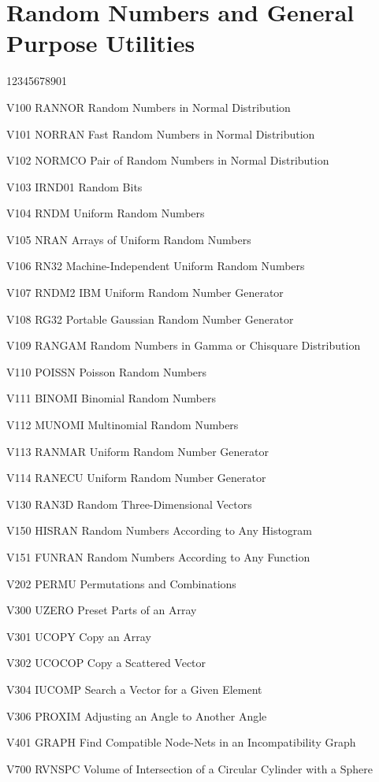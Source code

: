 \section*{Random Numbers and General Purpose Utilities}
\begin{DLtt}{12345678901}
\item[V100 RANNOR] Random Numbers in Normal Distribution
\item[V101 NORRAN] Fast Random Numbers in Normal Distribution
\item[V102 NORMCO] Pair of Random Numbers in Normal Distribution
\item[V103 IRND01] Random Bits
\item[V104 RNDM] Uniform Random Numbers
\item[V105 NRAN] Arrays of Uniform Random Numbers
\item[V106 RN32] Machine-Independent Uniform Random Numbers
\item[V107 RNDM2] IBM Uniform Random Number Generator
\item[V108 RG32] Portable Gaussian Random Number Generator
\item[V109 RANGAM] Random Numbers in Gamma or Chisquare Distribution
\item[V110 POISSN] Poisson Random Numbers
\item[V111 BINOMI] Binomial Random Numbers
\item[V112 MUNOMI] Multinomial Random Numbers
\item[V113 RANMAR] Uniform Random Number Generator
\item[V114 RANECU] Uniform Random Number Generator
\item[V130 RAN3D] Random Three-Dimensional Vectors
\item[V150 HISRAN] Random Numbers According to Any Histogram
\item[V151 FUNRAN] Random Numbers According to Any Function
\item[V202 PERMU] Permutations and Combinations
\item[V300 UZERO] Preset Parts of an Array
\item[V301 UCOPY] Copy an Array
\item[V302 UCOCOP] Copy a Scattered Vector
\item[V304 IUCOMP] Search a Vector for a Given Element
\item[V306 PROXIM] Adjusting an Angle to Another Angle
\item[V401 GRAPH] Find Compatible Node-Nets in an Incompatibility Graph
\item[V700 RVNSPC] Volume of Intersection of a Circular Cylinder with a Sphere
\end{DLtt}

